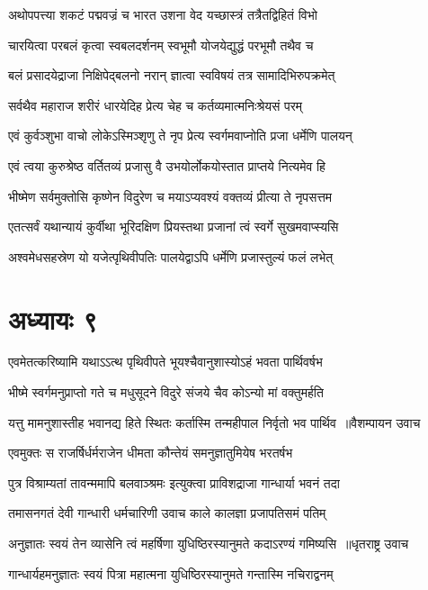 \twolineshloka
{अथोपपत्त्या शकटं पद्मवज्रं च भारत}
{उशना वेद यच्छास्त्रं तत्रैतद्विहितं विभो}


\twolineshloka
{चारयित्वा परबलं कृत्वा स्वबलदर्शनम्}
{स्वभूमौ योजयेद्युद्धं परभूमौ तथैव च}


\twolineshloka
{बलं प्रसादयेद्राजा निक्षिपेद्बलनो नरान्}
{ज्ञात्वा स्वविषयं तत्र सामादिभिरुपक्रमेत्}


\twolineshloka
{सर्वथैव महाराज शरीरं धारयेदिह}
{प्रेत्य चेह च कर्तव्यमात्मनिःश्रेयसं परम्}


\twolineshloka
{एवं कुर्वञ्शुभा वाचो लोकेऽस्मिञ्शृणु ते नृप}
{प्रेत्य स्वर्गमवाप्नोति प्रजा धर्मेणि पालयन्}


\twolineshloka
{एवं त्वया कुरुश्रेष्ठ वर्तितव्यं प्रजासु वै}
{उभयोर्लोकयोस्तात प्राप्तये नित्यमेव हि}


\twolineshloka
{भीष्मेण सर्वमुक्तोसि कृष्णेन विदुरेण च}
{मयाऽप्यवश्यं वक्तव्यं प्रीत्या ते नृपसत्तम}


\twolineshloka
{एतत्सर्वं यथान्यायं कुर्वीथा भूरिदक्षिण}
{प्रियस्तथा प्रजानां त्वं स्वर्गे सुखमवाप्स्यसि}


\twolineshloka
{अश्वमेधसहस्रेण यो यजेत्पृथिवीपतिः}
{पालयेद्वाऽपि धर्मेणि प्रजास्तुल्यं फलं लभेत्}


\chapter{अध्यायः ९}
\twolineshloka
{एवमेतत्करिष्यामि यथाऽऽत्थ पृथिवीपते}
{भूयश्चैवानुशास्योऽहं भवता पार्थिवर्षभ}


\twolineshloka
{भीष्मे स्वर्गमनुप्राप्तो गते च मधुसूदने}
{विदुरे संजये चैव कोऽन्यो मां वक्तुमर्हति}


\threelineshloka
{यत्तु मामनुशास्तीह भवानद्य हिते स्थितः}
{कर्तास्मि तन्महीपाल निर्वृतो भव पार्थिव ॥वैशम्पायन उवाच}
{}


\twolineshloka
{एवमुक्तः स राजर्षिर्धर्मराजेन धीमता}
{कौन्तेयं समनुज्ञातुमियेष भरतर्षभ}


\twolineshloka
{पुत्र विश्राम्यतां तावन्ममापि बलवाञ्श्रमः}
{इत्युक्त्वा प्राविशद्राजा गान्धार्या भवनं तदा}


\twolineshloka
{तमासनगतं देवी गान्धारी धर्मचारिणी}
{उवाच काले कालज्ञा प्रजापतिसमं पतिम्}


\threelineshloka
{अनुज्ञातः स्वयं तेन व्यासेनि त्वं महर्षिणा}
{युधिष्ठिरस्यानुमते कदाऽरण्यं गमिष्यसि ॥धृतराष्ट्र उवाच}
{}


\twolineshloka
{गान्धार्यहमनुज्ञातः स्वयं पित्रा महात्मना}
{युधिष्ठिरस्यानुमते गन्तास्मि नचिराद्वनम्}



